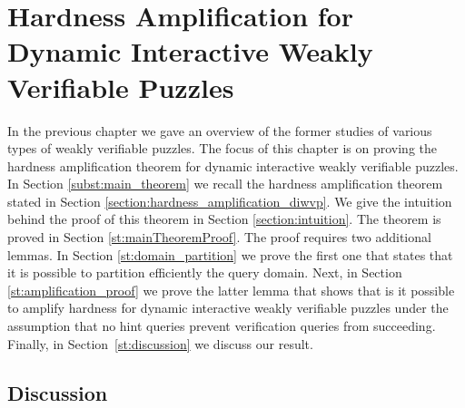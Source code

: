 \documentclass[11pt,a4paper,titlepage]{memoir}
\begin{document}
\chapter{Hardness Amplification for Dynamic Interactive Weakly Verifiable Puzzles}
\label{ch:main_result} %
In the previous chapter we gave an overview of the former studies of various types of weakly verifiable puzzles.
The focus of this chapter is on proving the hardness amplification theorem for dynamic interactive weakly verifiable puzzles.
In Section \ref{subst:main_theorem} we recall the hardness amplification theorem stated in Section \ref{section:hardness_amplification_diwvp}.
We give the intuition behind the proof of this theorem in Section \ref{section:intuition}.
The theorem is proved in Section \ref{st:mainTheoremProof}. The proof requires two additional lemmas.
In Section \ref{st:domain_partition} we prove the first one that states that it is possible to partition efficiently the query domain.
Next, in Section \ref{st:amplification_proof} we prove the latter lemma that shows that is it possible to amplify hardness for dynamic interactive weakly
verifiable puzzles under the assumption that no hint queries prevent verification queries from succeeding.
Finally, in Section~\ref{st:discussion} we discuss our result.
%





%
\section{Discussion}
\label{ch:discussion}

%
\appendix

%
\backmatter
%


%
\end{document}
